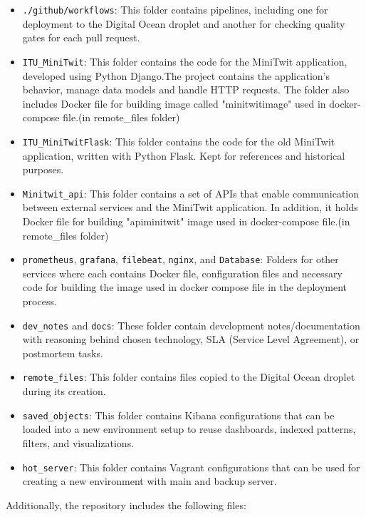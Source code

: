 \documentclass{article}
\begin{document}
\begin{itemize}
  \item \texttt{./github/workflows}: This folder contains pipelines, including one for deployment to the Digital Ocean droplet and another for checking quality gates for each pull request.
  
  \item \texttt{ITU\_MiniTwit}: This folder contains the code for the MiniTwit application, developed using Python Django.The project contains the application's behavior, manage data models and handle HTTP requests. The folder also includes Docker file for building image called "minitwitimage" used in docker-compose file.(in remote\_files folder)
  
  \item \texttt{ITU\_MiniTwitFlask}: This folder contains the code for the old MiniTwit application, written with Python Flask. Kept for references and historical purposes.
  
  \item \texttt{Minitwit\_api}: This folder contains a set of APIs that enable communication between external services and the MiniTwit application. In addition, it holds Docker file for building "apiminitwit" image used in docker-compose file.(in remote\_files folder)
  
  \item  \texttt{prometheus}, \texttt{grafana}, \texttt{filebeat}, \texttt{nginx}, and \texttt{Database}: Folders for other services where each contains Docker file, configuration files and necessary code for building the image used in docker compose file in the deployment process.
  
  \item \texttt{dev\_notes} and  \texttt{docs}: These folder contain development notes/documentation with reasoning behind chosen technology, SLA (Service Level Agreement), or postmortem tasks.
  
  \item \texttt{remote\_files}: This folder contains files copied to the Digital Ocean droplet during its creation.
  
  \item \texttt{saved\_objects}: This folder contains Kibana configurations that can be loaded into a new environment setup to reuse dashboards, indexed patterns, filters, and visualizations.
  \item \texttt{hot\_server}: This folder contains Vagrant configurations that can be used for creating a new environment with main and backup server.
\end{itemize}
Additionally, the repository includes the following files:
\end{document}
